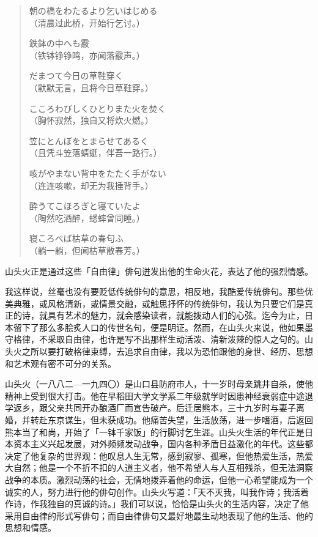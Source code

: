 {\begin{quote}
    {\FM 朝の橋をわたるより乞いはじめる}\\
    （清晨过此桥，开始行乞讨。）

    {\FM 鉄鉢の中へも霰}\\
    （铁钵铮铮鸣，亦闻落霰声。）

    {\FM だまつて今日の草鞋穿く}\\
    （默默无言，且将今日草鞋穿。）

    {\FM こころわびしくひとりまた火を焚く}\\
    （胸怀寂然，独自又将炊火燃。）

    {\FM 笠にとんぼをとまらせてあるく}\\
    （且凭斗笠落蜻蜓，伴吾一路行。）

    {\FM 咳がやまない背中をたたく手がない}\\
    （连连咳嗽，却无为我捶背手。）

    {\FM 酔うてこほろぎと寝ていたよ}\\
    （陶然吃酒醉，蟋蟀曾同睡。）

    {\FM 寝ころべば枯草の春匂ふ}\\
    （躺一躺，但闻枯草散春芳。）
\end{quote}

山头火正是通过这些「自由律」俳句迸发出他的生命火花，表达了他的强烈情感。

我这样说，丝毫也没有要贬低传统俳句的意思，相反地，我酷爱传统俳句。那些优美典雅，或风格清新，或情景交融，或触思抒怀的传统俳句，我认为只要它们是真正的诗，就具有艺术的魅力，就会感染读者，就能拨动人们的心弦。迄今为止，日本留下了那么多脍炙人口的传世名句，便是明证。然而，在山头火来说，他如果墨守格律，不采取自由律，也许是写不出那样生动活泼、清新泼辣的惊人之句的。山头火之所以要打破格律束缚，去追求自由律，我以为恐怕跟他的身世、经历、思想和艺术观有密不可分的关系。

山头火（一八八二—一九四〇）是山口县防府市人，十一岁时母亲跳井自杀，使他精神上受到很大打击。他在早稻田大学文学系二年级就学时因患神经衰弱症中途退学返乡，跟父亲共同开办酿酒厂而宣告破产。后迁居熊本，三十九岁时与妻子离婚，并转赴东京谋生，但未获成功。他痛苦失望，生活放荡，进一步嗜酒，后返回熊本当了和尚，开始了「一钵千家饭」的行脚讨乞生涯。山头火生活的年代正是日本资本主义兴起发展，对外频频发动战争，国内各种矛盾日益激化的年代。这些都决定了他复杂的世界观：他叹息人生无常，感到寂寥、孤寒，但他热爱生活，热爱大自然；他是一个不折不扣的人道主义者，他不希望人与人互相残杀，但无法洞察战争的本质。激烈动荡的社会，无情地拨弄着他的命运，但他一心希望能成为一个诚实的人，努力进行他的俳句创作。山头火写道：「天不灭我，叫我作诗；我活着作诗，作我独自的真诚的诗。」我们可以说，恰恰是山头火的生活内容，决定了他采用自由律的形式写俳句；而自由律俳句又最好地最生动地表现了他的生活、他的思想和情感。

}
